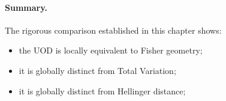 \paragraph{Summary.}
The rigorous comparison established in this chapter shows:
\begin{itemize}
  \item the UOD is locally equivalent to Fisher geometry;
  \item it is globally distinct from Total Variation;
  \item it is globally distinct from Hellinger distance;
\end{itemize}
